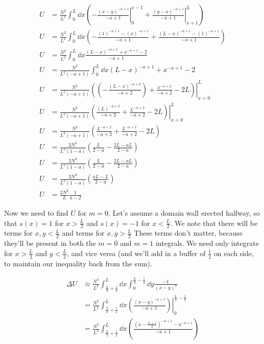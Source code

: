 \documentclass[../../PS3.tex]{subfiles}
\begin{document}
\begin{align}
	U &= \frac{N^2}{L^2} \int_0^{L} \dd{x} \left( \left. - \frac{(x - y)^{-a + 1}}{-a + 1}  \right|_{0}^{x - 1} +  \left. \frac{(y - x)^{-a + 1}}{-a + 1}  \right|_{x+1}^{L} \right) \\
	U &= \frac{N^2}{L^2} \int_0^{L} \dd{x} \left(  - \frac{(1)^{-a + 1} - (x)^{-a + 1}}{-a + 1}  +  \frac{(L - x)^{-a + 1} - (1)^{-a + 1}}{-a + 1}  \right) \\
	U &= \frac{N^2}{L^2} \int_0^{L} \dd{x} \frac{(L - x)^{-a + 1} + x^{-a + 1} - 2}{-a + 1}  \\
	U &= \frac{N^2}{L^2 (-a + 1)} \int_0^{L} \dd{x} (L - x)^{-a + 1} + x^{-a + 1} - 2 \\
	U &= \frac{N^2}{L^2 (-a + 1)} \left. \left( \left( -\frac{(L - x)^{-a + 2}}{-a + 2}\right) + \frac{x^{-a + 2}}{-a + 2} - 2L \right)\right|_{x = 0}^{L} \\
	U &= \frac{N^2}{L^2 (-a + 1)} \left. \left( \frac{(L)^{-a + 2}}{-a + 2} + \frac{L^{-a + 2}}{-a + 2} - 2L \right)\right|_{x = 0}^{L} \\
	U &= \frac{N^2}{L^2 (-a + 1)} \left( \frac{L^{-a + 2}}{-a + 2} + \frac{L^{-a + 2}}{-a + 2} - 2L \right) \\ 
	U&= \frac{2 N^2}{L^2 (1 - a)} \left(\frac{L}{2 - a} - \frac{2L - aL}{2 - a} \right) \\
	U&= \frac{2 N^2}{L^2 (1 - a)} \left(\frac{L}{2 - a} - \frac{2L - aL}{2 - a} \right) \\
	U&= \frac{2 N^2}{L^2 (1 - a)} \left(\frac{aL - L}{2 - a}  \right) \\
	U&= \frac{2 N^2}{L} \frac{1}{a - 2}
\end{align}

Now we need to find $U$ for $m = 0$. Let's assume a domain wall erected halfway, so that $s(x) = 1$ for $x > \frac{L}{2}$ and $s(x) = -1$ for $x < \frac{L}{2}$. We note that there will be terms for $x,y < \frac{L}{2}$ and terms for $x,y > \frac{L}{2}$ These terms don't matter, because they'll be present in both the $m = 0$ and $m = 1$ integrals. We need only integrate for $x > \frac{L}{2}$ and $y < \frac{L}{2}$, and vice versa (and we'll add in a buffer of $\frac12$ on each side, to maintain our inequality back from the sum). 

\begin{align}
	\Delta U &\approx  \frac{N^2}{L^2}  \int_{\frac{L}{2} + \frac12}^{L} \dd{x} \int_{0}^{\frac{L}{2} - \frac{1}{2}} \dd{y} \frac{-1}{(x - y)^a} \\
	&=  \frac{N^2}{L^2}  \int_{\frac{L}{2} + \frac12}^{L} \dd{x} \left. \left( \frac{(x - y)^{-a + 1}}{-a + 1} \right) \right|_{0}^{\frac{L}{2} - \frac{1}{2}} \\
	&=  \frac{N^2}{L^2}  \int_{\frac{L}{2} + \frac12}^{L} \dd{x} \left(  \frac{(x - \frac{L + 1}{2})^{-a + 1}  - x^{-a + 1}}{-a + 1} \right)
\end{align}
\end{document}
